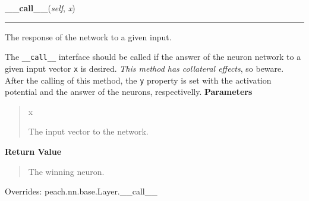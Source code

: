 \hspace{.8\funcindent}\begin{boxedminipage}{\funcwidth}

    \raggedright \textbf{\_\_call\_\_}(\textit{self}, \textit{x})

    \vspace{-1.5ex}

    \rule{\textwidth}{0.5\fboxrule}
\setlength{\parskip}{2ex}

The response of the network to a given input.

The \texttt{\_\_call\_\_} interface should be called if the answer of the neuron
network to a given input vector \texttt{x} is desired. \emph{This method has
collateral effects}, so beware. After the calling of this method, the
\texttt{y} property is set with the activation potential and the answer of
the neurons, respectivelly.
\setlength{\parskip}{1ex}
      \textbf{Parameters}
      \vspace{-1ex}

      \begin{quote}
        \begin{Ventry}{x}

          \item[x]


The input vector to the network.
        \end{Ventry}

      \end{quote}

      \textbf{Return Value}
    \vspace{-1ex}

      \begin{quote}

The winning neuron.
      \end{quote}

      Overrides: peach.nn.base.Layer.\_\_call\_\_

    \end{boxedminipage}

    \label{peach:nn:nnet:SOM:learn}

    \vspace{0.5ex}

